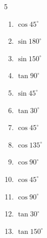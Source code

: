 \begin{multicols}{5}
\begin{enumerate}
  \item $\displaystyle \cos{45^\circ}$


  \item $\displaystyle \sin{180^\circ}$

        \phantom{$\displaystyle =0$}

  \item $\displaystyle \sin{150^\circ}$


  \item $\displaystyle \tan{90^\circ}$

        \phantom{$\displaystyle なし$}

  \item $\displaystyle \sin{45^\circ}$


  \item $\displaystyle \tan{30^\circ}$


  \item $\displaystyle \cos{45^\circ}$


  \item $\displaystyle \cos{135^\circ}$


  \item $\displaystyle \cos{90^\circ}$

        \phantom{$\displaystyle =0$}

  \item $\displaystyle \cos{45^\circ}$


  \item $\displaystyle \cos{90^\circ}$

        \phantom{$\displaystyle =0$}

  \item $\displaystyle \tan{30^\circ}$


  \item $\displaystyle \tan{150^\circ}$


\end{enumerate}
\end{multicols}

